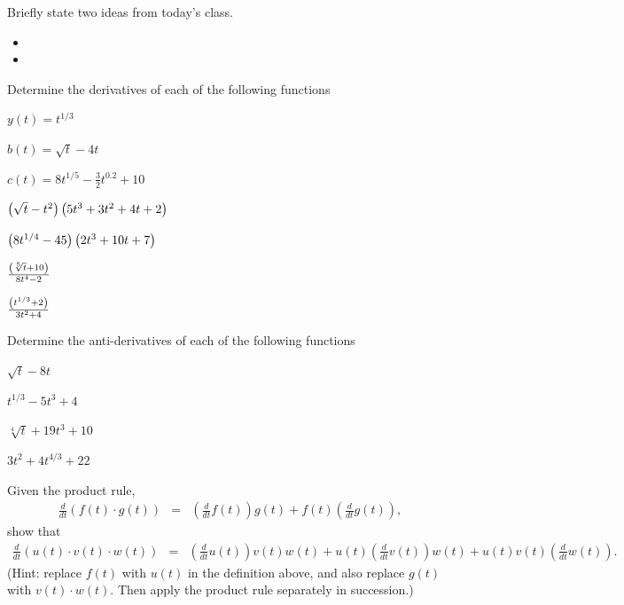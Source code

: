 \begin{problem}
\item Briefly state two ideas from today's class.
  \begin{itemize}
  \item
  \item
  \end{itemize}
\item Determine the derivatives of each of the following functions
  \begin{subproblem}
    \item $y(t)=t^{1/3}$
      \vfill
    \item $b(t)=\sqrt{t} - 4t$
      \vfill
    \item $c(t) = 8 t^{1/5} - \frac{3}{2} t^{0.2} + 10$
      \vfill
    \item $\left( \sqrt{t} - t^2 \right) \left( 5 t^3 + 3 t^2 + 4t +2 \right)$
      \vfill
    \item $\left( 8 t^{1/4} - 45 \right) \left( 2 t^3 + 10 t + 7 \right)$
      \vfill
    \item $\frac{\left( \sqrt[5]{t}+10 \right)}{8t^4-2}$
      \vfill
    \item $\frac{\left( t^{1/3}+2 \right)}{3t^2+4}$
      \vfill
  \end{subproblem}
  \clearpage
\item Determine the anti-derivatives of each of the following functions
  \begin{subproblem}
    \item $\sqrt{t} - 8t$
      \vfill
    \item $t^{1/3} - 5 t^3 + 4$
      \vfill
    \item $\sqrt[4]{t} + 19 t^3 + 10$
      \vfill
    \item $3 t^2 + 4 t^{4/3} + 22$
      \vfill
  \end{subproblem}
  \clearpage

\item Given the product rule,
  \begin{eqnarray*}
    \frac{d}{dt} \left( f(t)\cdot g(t)\right) & = &
          \left(\frac{d}{dt} f(t) \right) g(t) + f(t) \left( \frac{d}{dt} g(t) \right), 
  \end{eqnarray*}
  show that
  \begin{eqnarray*}
    \frac{d}{dt} \left( u(t)\cdot v(t) \cdot w(t) \right) & = &
              \left(\frac{d}{dt} u(t) \right) v(t) w(t) +
              u(t) \left( \frac{d}{dt} v(t) \right) w(t) +
              u(t) v(t) \left( \frac{d}{dt} w(t) \right).
  \end{eqnarray*}
  (Hint: replace $f(t)$ with $u(t)$ in the definition above, and also
  replace $g(t)$ with $v(t)\cdot w(t)$. Then apply the product rule
  separately in succession.)
  

\end{problem}
